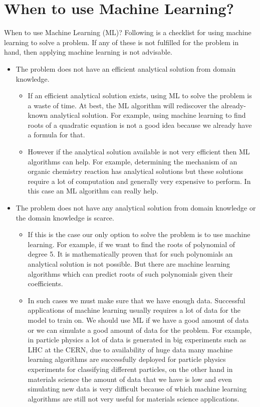 \documentclass[11pt,notheorems,hyperref={pdfauthor=whatever}]{beamer}
\begin{document}
\section{When to use Machine Learning?}
\begin{frame}[allowframebreaks]{When to use Machine Learning (ML)?}
\bigskip
Following is a checklist for using machine learning to solve a problem. If any of these is not fulfilled for the problem in hand, then applying machine learning is not advisable.
\bigskip
\begin{itemize}
    \item The problem does not have an efficient analytical solution from domain knowledge. 
    \bigskip
    \begin{itemize}
        \item If an efficient analytical solution exists, using ML to solve the problem is a waste of time. At best, the ML algorithm will rediscover the already-known analytical solution. For example, using machine learning to find roots of a quadratic equation is not a good idea because we already have a formula for that. 
        \item However if the analytical solution available is not very efficient then ML algorithms can help. For example, determining the mechanism of an organic chemistry reaction has analytical solutions but these solutions require a lot of computation and generally very expensive to perform. In this case an ML algorithm can really help.
    \end{itemize}
    \bigskip
    \bigskip
    \bigskip
    \bigskip
    \item The problem does not have any analytical solution from domain knowledge or the domain knowledge is scarce.
    \bigskip
    \begin{itemize}
        \item If this is the case our only option to solve the problem is to use machine learning. For example, if we want to find the roots of polynomial of degree 5. It is mathematically proven that for such polynomials an analytical solution is not possible. But there are machine learning algorithms which can predict roots of such polynomials given their coefficients.
        \item In such cases we must make sure that we have enough data. Successful applications of machine learning usually requires a lot of data for the model to train on. We should use ML if we have a good amount of data or we can simulate a good amount of data for the problem. For example, in particle physics a lot of data is generated in big experiments such as LHC at the CERN, due to availability of huge data many machine learning algorithms are successfully deployed for particle physics experiments for classifying different particles, on the other hand in materials science the amount of data that we have is low and even simulating new data is very difficult because of which machine learning algorithms are still not very useful for materials science applications.
    \end{itemize}
\end{itemize}
\end{frame}
\end{document}
